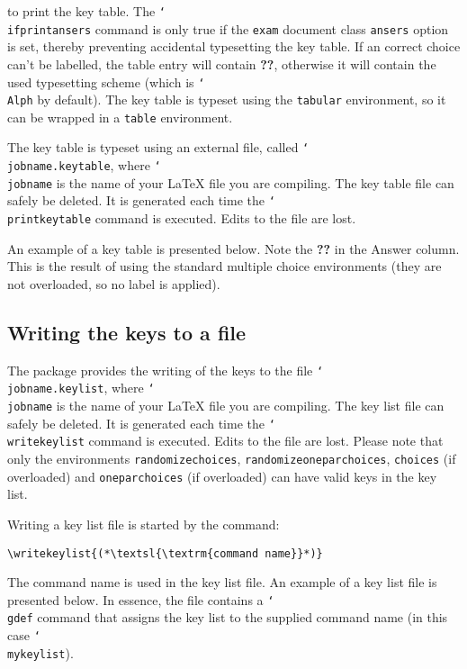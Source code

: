 \documentclass[12pt,a4paper]{exam}
\providecommand{\texorpdfstring}[2]{#1}
\newcommand{\bs}{\texorpdfstring{\char`\\}{}}
\begin{document}
to print the key table. The \texttt{\bs ifprintansers} command is only true if the
\texttt{exam} document class \texttt{ansers} option is set, thereby preventing
accidental typesetting the key table. If an correct choice can't be labelled, the
table entry will contain \textbf{??}, otherwise it will contain the used typesetting scheme
(which is \texttt{\bs Alph} by default).
The key table is typeset using the \texttt{tabular}
environment, so it can be wrapped in a \texttt{table} environment.

The key table is typeset using an external file, called \texttt{\bs jobname.keytable},
where \texttt{\bs jobname} is the name of your \LaTeX{} file you are compiling.
The key table file can safely be deleted. It is generated each time the
\texttt{\bs printkeytable} command is executed. Edits to the file are lost.

An example of a key table is presented below. Note the \textbf{??} in the
Answer column. This is the result of using the standard multiple choice
environments (they are not overloaded, so no label is applied).

\printkeytable

\subsection{Writing the keys to a file}
The package provides the writing of the keys to the file \texttt{\bs jobname.keylist},
where \texttt{\bs jobname} is the name of your \LaTeX{} file you are compiling.
The key list file can safely be deleted. It is generated each time the
\texttt{\bs writekeylist} command is executed. Edits to the file are lost.
Please note that only the environments \texttt{randomizechoices},
\texttt{randomizeoneparchoices}, \texttt{choices} (if overloaded) and
\texttt{oneparchoices} (if overloaded) can have valid keys in the key list.

Writing a key list file is started by the command:

\begin{lstlisting}
\writekeylist{(*\textsl{\textrm{command name}}*)}
\end{lstlisting}

The command name is used in the key list file. An example of a key list file
is presented below. In essence, the file contains a \texttt{\bs gdef} command
that assigns the key list to the supplied command name (in this case
\texttt{\bs mykeylist}).

\writekeylist{\mykeylist}

\end{document}
